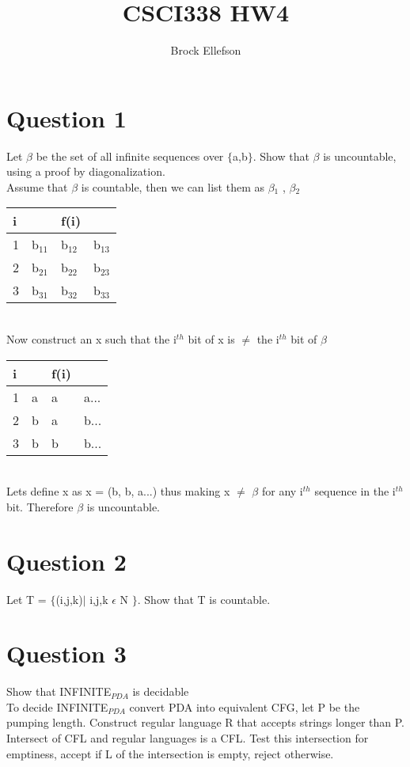 \documentclass[10pt,a4paper]{article}
\author{Brock Ellefson}
\title{CSCI338 HW4}
\begin{document}
\maketitle
\section*{Question 1}
Let $\beta$ be the set of all infinite sequences over $\lbrace$a,b$\rbrace$. Show that $\beta$ is uncountable,
using a proof by diagonalization.\\
Assume that $\beta$ is countable, then we can list them as $\beta$$_{1}$ , $\beta$$_{2}$
\begin{table}[h]
\centering
\begin{tabular}{l|lll}
i & {\ul } & f(i) &     \\ \hline
1 & b$_{11}$    & b$_{12}$  & b$_{13}$ \\
2 & b$_{21}$    & b$_{22}$  & b$_{23}$ \\
3 & b$_{31}$    & b$_{32}$  & b$_{33}$
\end{tabular}
\end{table}
\\Now construct an x such that the i$^{th}$ bit of x is $\neq$ the i$^{th}$ bit of $\beta$
\begin{table}[h]
\centering
\begin{tabular}{l|lll}
i & {\ul } & f(i) &   \\ \hline
1 & a      & a & a... \\
2 & b      & a & b... \\
3 & b      & b & b...
\end{tabular}
\end{table}
\\Lets define x as x = (b, b, a...) thus making x $\neq$ $\beta$ for any i$^{th}$ sequence in the i$^{th}$ bit. Therefore $\beta$ is uncountable.

\section*{Question 2}
Let T = $\lbrace$(i,j,k)$\mid$ i,j,k $\epsilon$ N $\rbrace$. Show that T is countable.\\

\section*{Question 3}
Show that INFINITE$_{PDA}$ is decidable\\
To decide INFINITE$_{PDA}$ convert PDA into equivalent CFG, let P be the pumping length. Construct regular language R that accepts strings longer than P. Intersect of CFL and regular languages is a CFL. Test this intersection for emptiness, accept if L of the intersection is empty, reject otherwise.
\end{document}
